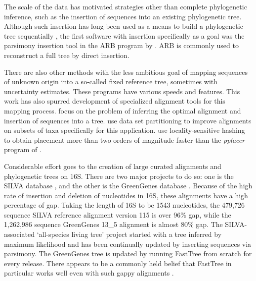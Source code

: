 \documentclass{amsart}
\begin{document}
The scale of the data has motivated strategies other than complete phylogenetic inference, such as the insertion of sequences into an existing phylogenetic tree.
Although such insertion has long been used as a means to build a phylogenetic tree sequentially \citep{kluge1969quantitative}, the first software with insertion specifically as a goal was the parsimony insertion tool in the ARB program by \citet{ludwig2004arb}.
ARB is commonly used to reconstruct a full tree by direct insertion.

There are also other methods with the less ambitious goal of mapping sequences of unknown origin into a so-called fixed reference tree, sometimes with uncertainty estimates.
These programs \citep{monierEaLargeViruses08,vonMeringEaQuantitative08,wu2008simple,matsen2010pplacer,stark2010mltreemap,berger2011performance} have various speeds and features.
This work has also spurred development of specialized alignment tools for this mapping process.
\citet{berger2011aligning} focus on the problem of inferring the optimal alignment and insertion of sequences into a tree.
\citet{Mirarab2012-pk} use data set partitioning to improve alignments on subsets of taxa specifically for this application.
\citet{Brown2013-ia} use locality-sensitive hashing to obtain placement more than two orders of magnitude faster than the \textit{pplacer} program of \citet{matsen2010pplacer}.

Considerable effort goes to the creation of large curated alignments and phylogenetic trees on 16S.
There are two major projects to do so: one is the SILVA database \citep{pruesse2007silva,quast2013silva}, and the other is the GreenGenes database \citep{desantis2006greengenes,mcdonald2011improved}.
Because of the high rate of insertion and deletion of nucleotides in 16S, these alignments have a high percentage of gap.
Taking the length of 16S to be 1543 nucleotides,
the 479,726 sequence SILVA reference alignment version 115 is over 96\% gap,
while the 1,262,986 sequence GreenGenes 13\_5 alignment is almost 80\% gap.
The SILVA-associated `all-species living tree' project \citep{yarza2008all} started with a tree inferred by maximum likelihood and has been continually updated  by inserting sequences via parsimony.
The GreenGenes tree is updated by running FastTree from scratch for every release.
There appears to be a commonly held belief that FastTree in particular works well even with such gappy alignments \citep[e.g.][]{sharpton2011phylotu}.
\end{document}
